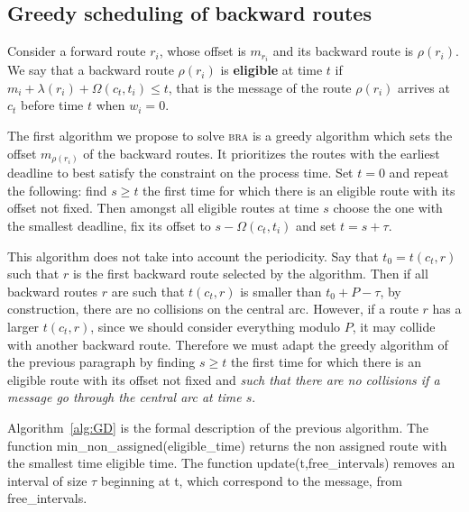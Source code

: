 \documentclass[a4paper,10pt]{article}
\newcommand\bra{\textsc{bra}\xspace}
\begin{document}
   \subsection{Greedy scheduling of backward routes}
    
    Consider a forward route $r_i$, whose offset is $m_{r_i}$ and its backward route is $\rho(r_i)$.
    We say that a backward route $\rho(r_i)$ is {\bf eligible} at time $t$ if $m_{i} +  \lambda(r_i) + \Omega(c_t,t_i) \leq t$, that is the message of the route $\rho(r_i)$ arrives at $c_t$ before time $t$ when $w_i = 0$.
    
    The first algorithm we propose to solve \bra is a greedy algorithm which sets the offset $m_{\rho(r_i)}$ of the 
    backward routes. It prioritizes the routes with the earliest deadline to best satisfy the
    constraint on the process time. Set $t=0$ and repeat the following: find $s \geq t$ the first time for which there is an eligible route with its offset not fixed. Then amongst all eligible routes at time $s$ choose the one with the smallest deadline, fix its offset to $s - \Omega(c_t,t_i) $ and set $t = s + \tau$.
    
    This algorithm does not take into account the periodicity. Say that $t_0 = t(c_t,r)$ such that $r$ is the first backward route selected by the algorithm. Then if all backward routes $r$ are such that $t(c_t,r)$ is smaller than $t_0 + P - \tau$,
    by construction, there are no collisions on the central arc.
    However, if a route $r$ has a larger $t(c_t,r)$, since we should consider everything modulo $P$, 
    it may collide with another backward route. Therefore we must adapt the greedy algorithm of the previous paragraph by finding $s \geq t$ the first time for which there is an eligible route with its offset not fixed and \emph{such that there are no collisions if a message go through the central arc at time $s$}. 
    
    Algorithm~\ref{alg:GD} is the formal description of the previous algorithm. 
     The function  min\_non\_assigned(eligible\_time) returns the non assigned route with the smallest time eligible time. The function update(t,free\_intervals) removes an interval of size $\tau$ beginning at t, which correspond to the message,  from free\_intervals.
     
\end{document}

